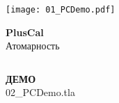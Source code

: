 \documentclass[
  11pt,aspectratio=1610,pdf,hyperref={unicode,colorlinks=false}
]{beamer}
\begin{document}
\begin{frame}[c]
  \begin{center}
    \texttt{[image: 01\_PCDemo.pdf]}%
  \end{center}
\end{frame}

\begin{frame}[c,fragile]
  \begin{overlayarea}{\textwidth}{7ex}
    \begin{minipage}{\textwidth}
      \centering%
      {\Large\bf PlusCal\\}%
      {Атомарность}%
    \end{minipage}%
  \end{overlayarea}%
  \begin{minipage}{\textwidth}
    \begin{columns}[T]
      \begin{column}{.45\textwidth}
      \end{column}
      \begin{column}{.45\textwidth}
      \end{column}
    \end{columns}
  \end{minipage}
\end{frame}

\begin{frame}[c]
  \centering
  {\Large\bf ДЕМО}\\[2ex]
  {\normalsize\ttfamily\textcolor{black!80}{02\_PCDemo.tla}}
\end{frame}
\end{document}
